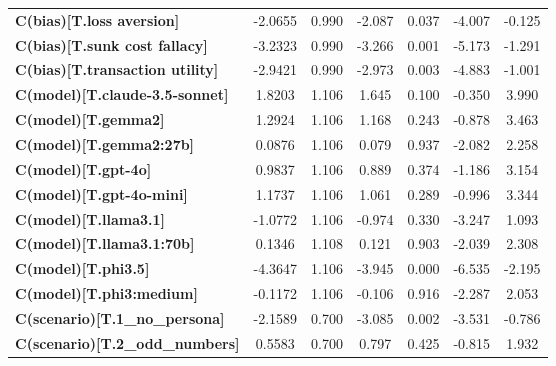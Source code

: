 \begin{center}
\begin{tabular}{lcccccc}
\textbf{C(bias)[T.loss aversion]}         &      -2.0655  &        0.990     &    -2.087  &         0.037        &       -4.007    &       -0.125     \\
\textbf{C(bias)[T.sunk cost fallacy]}     &      -3.2323  &        0.990     &    -3.266  &         0.001        &       -5.173    &       -1.291     \\
\textbf{C(bias)[T.transaction utility]}   &      -2.9421  &        0.990     &    -2.973  &         0.003        &       -4.883    &       -1.001     \\
\textbf{C(model)[T.claude-3.5-sonnet]}    &       1.8203  &        1.106     &     1.645  &         0.100        &       -0.350    &        3.990     \\
\textbf{C(model)[T.gemma2]}               &       1.2924  &        1.106     &     1.168  &         0.243        &       -0.878    &        3.463     \\
\textbf{C(model)[T.gemma2:27b]}           &       0.0876  &        1.106     &     0.079  &         0.937        &       -2.082    &        2.258     \\
\textbf{C(model)[T.gpt-4o]}               &       0.9837  &        1.106     &     0.889  &         0.374        &       -1.186    &        3.154     \\
\textbf{C(model)[T.gpt-4o-mini]}          &       1.1737  &        1.106     &     1.061  &         0.289        &       -0.996    &        3.344     \\
\textbf{C(model)[T.llama3.1]}             &      -1.0772  &        1.106     &    -0.974  &         0.330        &       -3.247    &        1.093     \\
\textbf{C(model)[T.llama3.1:70b]}         &       0.1346  &        1.108     &     0.121  &         0.903        &       -2.039    &        2.308     \\
\textbf{C(model)[T.phi3.5]}               &      -4.3647  &        1.106     &    -3.945  &         0.000        &       -6.535    &       -2.195     \\
\textbf{C(model)[T.phi3:medium]}          &      -0.1172  &        1.106     &    -0.106  &         0.916        &       -2.287    &        2.053     \\
\textbf{C(scenario)[T.1\_no\_persona]}    &      -2.1589  &        0.700     &    -3.085  &         0.002        &       -3.531    &       -0.786     \\
\textbf{C(scenario)[T.2\_odd\_numbers]}   &       0.5583  &        0.700     &     0.797  &         0.425        &       -0.815    &        1.932     \\

\end{tabular}
\end{center}
